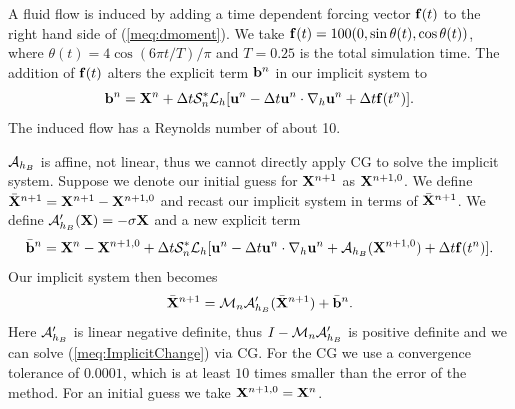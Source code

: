 A fluid flow is induced by adding a time dependent forcing vector $\mathbf{f}(t)$ to the right hand side of (\ref{meq:dmoment}). We take $\mathbf{f}(t) = 100 (0, \sin \theta(t), \cos \theta(t))$, where $\theta(t) = 4\cos(6\pi t / T) / \pi$ and $T=0.25$ is the total simulation time. The addition of $\mathbf{f}(t)$ alters the explicit term $\mathbf{b}^n$ in our implicit system to
\begin{equation}
\mathbf{b}^n = \mathbf{X}^n + \Delta t \mathcal{S}^*_n \mathcal{L}_h [\mathbf{u}^n-\Delta t \mathbf{u}^n \cdot \nabla_h \mathbf{u}^n + \Delta t \mathbf{f}(t^n)].
\label{meq:bn_flow}
\end{equation}
The induced flow has a Reynolds number of about 10.

$\mathcal{A}_{h_B}$ is affine, not linear, thus we cannot directly apply CG to solve the implicit system. Suppose we denote our initial guess for $\mathbf{X}^{n+1}$ as $\mathbf{X}^{n+1,0}$. We define $\bar{\mathbf{X}}^{n+1} = \mathbf{X}^{n+1}-\mathbf{X}^{n+1,0}$ and recast our implicit system in terms of $\bar{\mathbf{X}}^{n+1}$. We define $\mathcal{A}'_{h_B}(\mathbf{X}) = -\sigma\mathbf{X}$ and  a new explicit term
\begin{equation}
\bar{\mathbf{b}}^n = \mathbf{X}^n - \mathbf{X}^{n+1,0} + \Delta t \mathcal{S}^*_n \mathcal{L}_h [\mathbf{u}^n-\Delta t \mathbf{u}^n \cdot \nabla_h \mathbf{u}^n + \mathcal{A}_{h_B}(\mathbf{X}^{n+1,0}) + \Delta t \mathbf{f}(t^n)].
\label{meq:bn_change}
\end{equation}
Our implicit system then becomes
\begin{equation}
\bar{\mathbf{X}}^{n+1} = \mathcal{M}_n\mathcal{A}'_{h_B} (\bar{\mathbf{X}}^{n+1}) + \bar{\mathbf{b}}^n.
\label{meq:ImplicitChange}
\end{equation}
Here $\mathcal{A}'_{h_B}$ is linear negative definite, thus $I - \mathcal{M}_n\mathcal{A}'_{h_B}$ is positive definite and we can solve (\ref{meq:ImplicitChange}) via CG.
For the CG we use a convergence tolerance of $0.0001$, which is at least $10$ times smaller than the error of the method. For an initial guess we take $\mathbf{X}^{n+1,0}=\mathbf{X}^n$.

